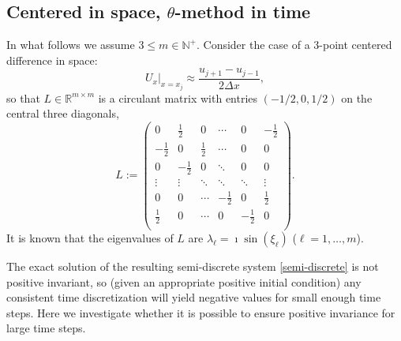 \documentclass[a4paper]{article}
\newcommand{\dx}{\Delta x}
\newcommand{\nplus}{\mathbb{N}^+}
\begin{document}
\subsection{Centered in space, $\theta$-method in time}\label{sectioncentered}
In what follows we assume $3\le m\in\nplus$. Consider the case of a 3-point centered difference  in space:
\[
    U_x\Big|_{x=x_j} \approx \frac{u_{j+1}-u_{j-1}}{2\dx},
\]
so that $L\in\mathbb{R}^{m\times m}$ is a circulant matrix with entries $(-1/2, 0, 1/2)$ on the central
three diagonals,
\begin{equation}\label{Ldef}
L:=\left(
\begin{array}{cccccc}
 0 & \frac{1}{2} & 0  & \cdots & 0 & -\frac{1}{2} \\
 -\frac{1}{2} & 0 & \frac{1}{2} &  \cdots & 0 & 0 \\
 0 & -\frac{1}{2} & 0 &  \ddots & 0 & 0\\
 \vdots  & \vdots  & \ddots  & \ddots & \ddots & \vdots \\
  0 & 0 & \cdots  & -\frac{1}{2} & 0 & \frac{1}{2} \\
 \frac{1}{2} & 0 & \cdots & 0 & -\frac{1}{2} & 0 \\
\end{array}
\right).
\end{equation}
It is known that the eigenvalues of $L$ are $\lambda_\ell=\imath \sin(\xi_\ell)$ ($\ell=1,\ldots,m$).

 The exact solution of the resulting semi-discrete
system \eqref{semi-discrete} is not positive invariant, so (given an appropriate
positive initial condition) any consistent time discretization will yield
negative values for small enough time steps.  Here we investigate whether
it is possible to ensure positive invariance for large time steps.
\end{document}
